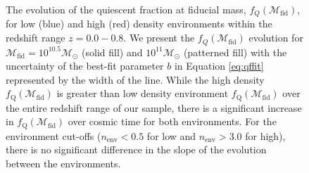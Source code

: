 \documentclass{aastex}
\begin{document}
\begin{figure}
    \begin{center}
        \leavevmode
        \caption{The evolution of the quiescent fraction at fiducial
          mass, $f_{Q}(\mathcal{M}_{\mathrm{fid}})$, for low (blue) and
          high (red) density environments within the redshift range $z
          = 0.0 - 0.8$. We present the $f_{Q}(\mathcal{M}_{\mathrm{fid}})$
          evolution for $\mathcal{M}_{\mathrm{fid}} = 10^{10.5}
          \mathcal{M}_\odot$ (solid fill) and $10^{11}
          \mathcal{M}_\odot$ (patterned fill) with the uncertainty of
          the best-fit parameter $b$ in Equation \ref{eq:qffit}
          represented by the width of the line. While the high density $f_{\mathrm{Q}}(\mathcal{M}_{\mathrm{fid}})$ is greater than low density environment $f_{\mathrm{Q}}(\mathcal{M}_{\mathrm{fid}})$ over the entire redshift range of our sample, there is a significant increase in $f_{\mathrm{Q}}(\mathcal{M}_{\mathrm{fid}})$ over cosmic time for both environments. For the environment cut-offs ($n_{\mathrm{env}} < 0.5$ for low and $n_{\mathrm{env}} > 3.0$ for high), there is no significant difference in the slope of the evolution between the environments.}         \label{fig:qffit}
    \end{center}
\end{figure}
\end{document}

